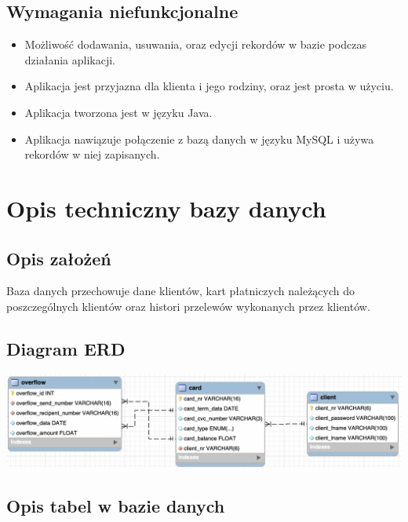 \documentclass[12pt, letterpaper]{article}
\begin{document}
\newpage

\subsection{Wymagania niefunkcjonalne}
\begin{itemize}
\item Możliwość dodawania, usuwania, oraz edycji rekordów w bazie podczas działania aplikacji.
\item Aplikacja jest przyjazna dla klienta i jego rodziny, oraz jest prosta w użyciu.
\item Aplikacja tworzona jest w języku Java.
\item Aplikacja nawiązuje połączenie z bazą danych w języku MySQL i używa rekordów w niej zapisanych.
\end{itemize}

\section{Opis techniczny bazy danych}

\subsection{Opis założeń}

\quad Baza danych przechowuje dane klientów, kart płatniczych należących do poszczególnych klientów oraz 
histori przelewów wykonanych przez klientów.

\subsection{Diagram ERD}

\includegraphics[scale=0.5]{erd}

\subsection{Opis tabel w bazie danych}
\end{document}

